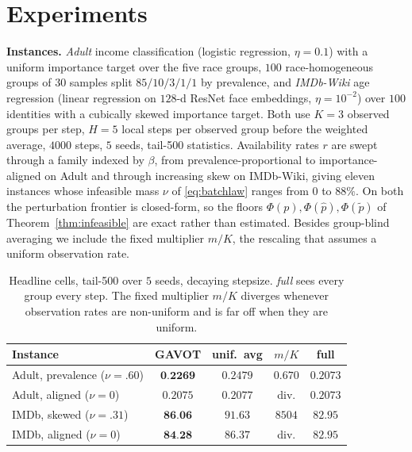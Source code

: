 \documentclass{article}
\theoremstyle{definition}
\newcommand{\avot}{\textsf{GAVOT}}
\newcommand{\best}[1]{\textbf{#1}}
\begin{document}
\section{Experiments}
\label{sec:exp}

\noindent\textbf{Instances.}
\emph{Adult} income classification \cite{uci_adult} (logistic regression,
$\eta{=}0.1$) with a uniform importance target over the five race groups, $100$
race-homogeneous groups of $30$ samples split $85/10/3/1/1$ by prevalence, and
\emph{IMDb-Wiki} age regression \cite{rothe2018imdbwiki} (linear regression on
$128$-d ResNet face embeddings, $\eta{=}10^{-2}$) over $100$ identities with a
cubically skewed importance target. Both use $K=3$ observed groups per step,
$H{=}5$ local steps per observed group before the weighted average, $4000$
steps, $5$ seeds, tail-500 statistics. Availability rates $r$ are swept through a
family indexed by $\beta$, from prevalence-proportional to importance-aligned
on Adult and through increasing skew on IMDb-Wiki, giving eleven instances whose
infeasible mass $\nu$ of \eqref{eq:batchlaw} ranges from $0$ to $88\%$. On both
the perturbation frontier is closed-form, so the floors $\Phi(p),\Phi(\hat p),
\Phi(\tilde p)$ of Theorem~\ref{thm:infeasible} are exact rather than estimated.
Besides group-blind averaging we include the fixed multiplier $m/K$, the
rescaling that assumes a uniform observation rate.

\begin{table}[t]
\centering
\caption{Headline cells, tail-500 over $5$ seeds, decaying stepsize. \emph{full}
sees every group every step. The fixed multiplier $m/K$ diverges whenever
observation rates are non-uniform and is far off when they are uniform.}
\label{tab:overall}
\setlength{\tabcolsep}{2.4pt}
\begin{tabular}{lcccc}
\toprule
Instance & \avot{} & unif.\ avg & $m/K$ & full \\
\midrule
Adult, prevalence ($\nu{=}.60$) & $\best{0.2269}$ & $0.2479$ & $0.670$ & $0.2073$ \\
Adult, aligned ($\nu{=}0$)      & $0.2075$ & $0.2077$ & div. & $0.2073$ \\
IMDb, skewed ($\nu{=}.31$)      & $\best{86.06}$ & $91.63$ & $8504$ & $82.95$ \\
IMDb, aligned ($\nu{=}0$)       & $\best{84.28}$ & $86.37$ & div. & $82.95$ \\
\bottomrule
\end{tabular}
\end{table}
\end{document}
